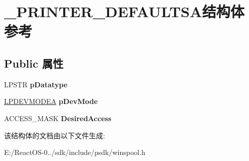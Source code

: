 \hypertarget{struct___p_r_i_n_t_e_r___d_e_f_a_u_l_t_s_a}{}\section{\+\_\+\+P\+R\+I\+N\+T\+E\+R\+\_\+\+D\+E\+F\+A\+U\+L\+T\+S\+A结构体 参考}
\label{struct___p_r_i_n_t_e_r___d_e_f_a_u_l_t_s_a}
\subsection*{Public 属性}
\begin{DoxyCompactItemize}
\item 
\mbox{\label{struct___p_r_i_n_t_e_r___d_e_f_a_u_l_t_s_a_a488a9098921c10a4ce50189ad965466b}} 
L\+P\+S\+TR {\bfseries p\+Datatype}
\item 
\mbox{\label{struct___p_r_i_n_t_e_r___d_e_f_a_u_l_t_s_a_a3d4e8a209df6d6b37a372c2362a94ca3}} 
\hyperlink{struct__devicemode_a}{L\+P\+D\+E\+V\+M\+O\+D\+EA} {\bfseries p\+Dev\+Mode}
\item 
\mbox{\label{struct___p_r_i_n_t_e_r___d_e_f_a_u_l_t_s_a_a4b49a1e9065c44f3c5b859e06d1cca15}} 
A\+C\+C\+E\+S\+S\+\_\+\+M\+A\+SK {\bfseries Desired\+Access}
\end{DoxyCompactItemize}


该结构体的文档由以下文件生成\+:\begin{DoxyCompactItemize}
\item 
E\+:/\+React\+O\+S-\/0../sdk/include/psdk/winspool.\+h\end{DoxyCompactItemize}

